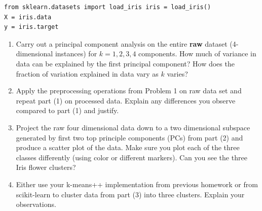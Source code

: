 \documentclass[12pt]{article}
\theoremstyle{quest}
\begin{document}
\begin{verbatim}
from sklearn.datasets import load_iris iris = load_iris()
X = iris.data
y = iris.target
\end{verbatim}

\begin{enumerate}
    \item Carry out a principal component analysis on the entire \textbf{raw} dataset (4-dimensional instances) for $k = 1, 2, 3, 4$ components. How much of variance in data can be explained by the first principal component? How does the fraction of variation explained in data vary as $k$ varies?
    \item Apply the preprocessing operations from Problem 1 on raw data set and repeat part (1) on processed data. Explain any differences you observe compared to part (1) and justify.
    \item Project the raw four dimensional data down to a two dimensional subspace generated by first two top principle components (PCs) from part (2) and produce a scatter plot of the data. Make sure you plot each of the three classes differently (using color or different markers). Can you see the three Iris flower clusters?
    \item Either use your k-means++ implementation from previous homework or from \textsf{scikit-learn} to cluster data from part (3) into three clusters. Explain your observations.
\end{enumerate}
\end{document}
